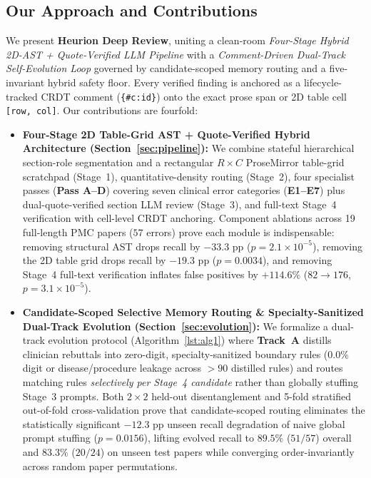 \documentclass[11pt,a4paper]{article}
\begin{document}
\subsection{Our Approach and Contributions}
We present \textbf{Heurion Deep Review}, uniting a clean-room \emph{Four-Stage Hybrid 2D-AST + Quote-Verified LLM Pipeline} with a \emph{Comment-Driven Dual-Track Self-Evolution Loop} governed by candidate-scoped memory routing and a five-invariant hybrid safety floor. Every verified finding is anchored as a lifecycle-tracked CRDT comment (\texttt{\{\#c:id\}}) onto the exact prose span or 2D table cell \texttt{[row, col]}. Our contributions are fourfold:

\begin{itemize}[leftmargin=1.5em,itemsep=2pt]
  \item \textbf{Four-Stage 2D Table-Grid AST + Quote-Verified Hybrid Architecture (Section~\ref{sec:pipeline}):} We combine stateful hierarchical section-role segmentation and a rectangular $R \times C$ ProseMirror table-grid scratchpad (Stage~1), quantitative-density routing (Stage~2), four specialist passes (\textbf{Pass A--D}) covering seven clinical error categories (\textbf{E1--E7}) plus dual-quote-verified section LLM review (Stage~3), and full-text Stage~4 verification with cell-level CRDT anchoring. Component ablations across 19 full-length PMC papers ($57$ errors) prove each module is indispensable: removing structural AST drops recall by $-33.3\text{ pp}$ ($p=2.1\times 10^{-5}$), removing the 2D table grid drops recall by $-19.3\text{ pp}$ ($p=0.0034$), and removing Stage~4 full-text verification inflates false positives by $+114.6\%$ ($82 \to 176$, $p=3.1\times 10^{-5}$).
  \item \textbf{Candidate-Scoped Selective Memory Routing \& Specialty-Sanitized Dual-Track Evolution (Section~\ref{sec:evolution}):} We formalize a dual-track evolution protocol (Algorithm~\ref{lst:alg1}) where \textbf{Track~A} distills clinician rebuttals into zero-digit, specialty-sanitized boundary rules ($0.0\%$ digit or disease/procedure leakage across $>90$ distilled rules) and routes matching rules \emph{selectively per Stage~4 candidate} rather than globally stuffing Stage~3 prompts. Both $2\times 2$ held-out disentanglement and 5-fold stratified out-of-fold cross-validation prove that candidate-scoped routing eliminates the statistically significant $-12.3\text{ pp}$ unseen recall degradation of naive global prompt stuffing ($p=0.0156$), lifting evolved recall to $89.5\%$ ($51/57$) overall and $83.3\%$ ($20/24$) on unseen test papers while converging order-invariantly across random paper permutations.

\end{itemize}
\end{document}
